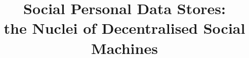 \documentclass{sig-alternate}
\begin{document}
%

\title{Social Personal Data Stores: \\ the Nuclei of Decentralised Social Machines}

%
%
%
%
%

%
%
%
\end{document}
